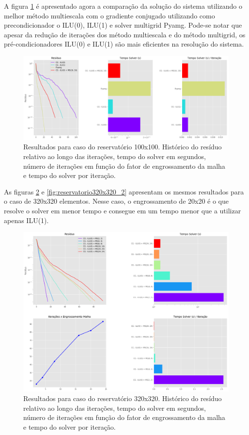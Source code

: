 A figura \ref{fig:reservatorio100x100_2} é apresentado agora a comparação da solução do sistema utilizando o melhor método multiescala com o gradiente conjugado utilizando como precondicionador o ILU(0), ILU(1) e solver multigrid Pyamg. Pode-se notar que apesar da redução de iterações dos método multiescala e do método multigrid, os pré-condicionadores ILU(0) e ILU(1) são mais eficientes na resolução do sistema. 


\begin{figure}[!htbp]
\label{fig:reservatorio100x100_2}
\centering
\includegraphics[width=\textwidth]{chap08/figs/reservatorio100x100_2.png}
\caption{Resultados para caso do reservatório 100x100. Histórico do resíduo relativo ao longo das iterações, tempo do solver em segundos, número de iterações em função do fator de engrossamento da malha e tempo do solver por iteração. }
\end{figure}



As figuras \ref{fig:reservatorio320x320_1} e \ref{fig:reservatorio320x320_2} apresentam os mesmos resultados para o caso de 320x320 elementos. Nesse caso, o engrossamento de 20x20 é o que resolve o solver em menor tempo e consegue em um tempo menor que a utilizar apenas ILU(1). 



\begin{figure}[!htbp]
\label{fig:reservatorio320x320_1}
\centering
\includegraphics[width=\textwidth]{chap08/figs/reservatorio320x320_1.png}
\caption{Resultados para caso do reservatório 320x320. Histórico do resíduo relativo ao longo das iterações, tempo do solver em segundos, número de iterações em função do fator de engrossamento da malha e tempo do solver por iteração. }
\end{figure}


